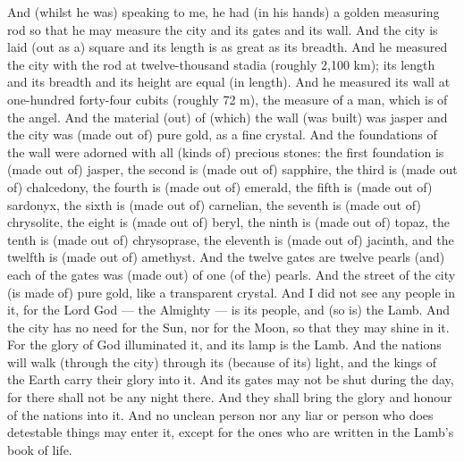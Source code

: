 \begin{pages}
\begin{Leftside}
		\pend
		\pstart
		And (whilst he was) speaking to me, he had (in his hands) a golden measuring rod so that he may measure the city and its gates and its wall. And the city is laid (out as a) square and its length is as great as its breadth. And he measured the city with the rod at twelve-thousand stadia (roughly 2,100 km); its length and its breadth and its height are equal (in length). And he measured its wall at one-hundred forty-four cubits (roughly 72 m), the measure of a man, which is of the angel. And the material (out) of (which) the wall (was built) was jasper and the city was (made out of) pure gold, as a fine crystal. 
		\pend
		\pstart
		And the foundations of the wall were adorned with all (kinds of) precious stones: the first foundation is (made out of) jasper, the second is (made out of) sapphire, the third is (made out of) chalcedony, the fourth is (made out of) emerald, the fifth is (made out of) sardonyx, the sixth is (made out of) carnelian, the seventh is (made out of) chrysolite, the eight is (made out of) beryl, the ninth is (made out of) topaz, the tenth is (made out of) chrysoprase, the eleventh is (made out of) jacinth, and the twelfth is (made out of) amethyst. And the twelve gates are twelve pearls (and) each of the gates was (made out) of one (of the) pearls. And the street of the city (is made of) pure gold, like a transparent crystal.
		\pend
		\pstart
		And I did not see any people in it, for the Lord God — the Almighty — is its people, and (so is) the Lamb. And the city has no need for the Sun, nor for the Moon, so that they may shine in it. For the glory of God illuminated it, and its lamp is the Lamb. And the nations will walk (through the city) through its (because of its) light, and the kings of the Earth carry their glory into it. And its gates may not be shut during the day, for there shall not be any night there. And they shall bring the glory and honour of the nations into it. And no unclean person nor any liar or person who does detestable things may enter it, except for the ones who are written in the Lamb’s book of life. 
		\pend
        \endnumbering
    \end{Leftside}

\end{pages} 
\Pages

